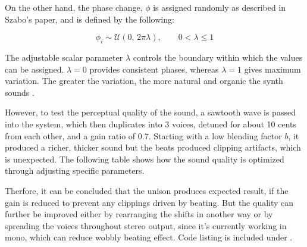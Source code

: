 On the other hand, the phase change, $\phi$ is assigned randomly as described in Szabo's paper, and is defined by the following:

\begin{equation}\label{eq:unison_phase}
    \phi_i \sim \mathcal{U}\!\left(0,\,2\pi\lambda\right), \qquad 0 < \lambda \leq 1
\end{equation}

The adjustable scalar parameter $\lambda$ controls the boundary within which the values can be assigned. $\lambda = 0$ provides consistent
phases, whereas $\lambda = 1$ gives maximum variation. The greater the variation, the more natural and organic the synth sounds \cite{szabo_supersaw}.

However, to test the perceptual quality of the sound, a sawtooth wave is passed into the system, which then duplicates into 3 voices,
detuned for about 10 cents from each other, and a gain ratio of 0.7. Starting with a low blending factor $b$, it produced a richer, thicker sound 
but the beats produced clipping artifacts, which is unexpected. The following table shows how the sound quality is
optimized through adjusting specific parameters.



Therfore, it can be concluded that the unison produces expected result, if the gain is reduced
to prevent any clippings driven by beating. But the quality can further be improved either
by rearranging the shifts in another way or by spreading the voices throughout stereo output, 
since it's currently working in mono, which can reduce wobbly beating effect. Code listing is included
under .
